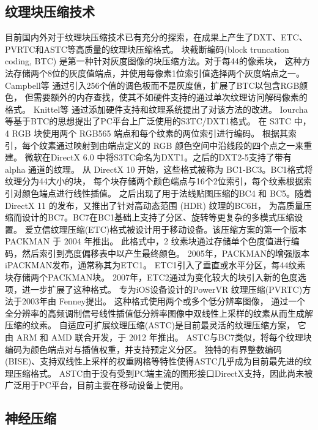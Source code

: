 \subsection{纹理块压缩技术}
目前国内外对于纹理块压缩技术已有充分的探索，在成果上产生了DXT、ETC、PVRTC和ASTC等高质量的纹理块压缩格式。
块截断编码(block truncation coding, BTC)\cite{delp1979image}
是第一种针对灰度图像的块压缩方法。对于每4\times4的像素块，
这种方法存储两个8位的灰度值端点，并使用每像素1位索引值选择两个灰度端点之一。
Campbell等\cite{campbell1986two}
通过引入256个值的调色板而不是灰度值，扩展了BTC以包含RGB颜色，
但需要额外的内存查找，使其不如硬件支持的通过单次纹理访问解码像素的格式。 
Knittel等\cite{knittel1996hardware}
通过添加硬件支持和纹理系统提出了对该方法的改进。
Iourcha等\cite{iourcha1999system}基于BTC的思想提出了PC平台上广泛使用的S3TC/DXT1格式。
在 S3TC 中，4 RGB 块使用两个 RGB565 端点和每个纹素的两位索引进行编码。
根据其索引，每个纹素通过映射到由端点定义的 RGB 颜色空间中沿线段的四个点之一来重建。
微软在DirectX 6.0 中将S3TC命名为DXT1。之后的DXT2-5支持了带有 alpha 通道的纹理。
从 DirectX 10 开始，这些格式被称为 BC1-BC3。BC1格式将纹理分为4\times4大小的块，
每个块存储两个颜色端点与16个2位索引，每个纹素根据索引对颜色端点进行线性插值。
之后出现了用于法线贴图压缩的BC4 和 BC5。随着 DirectX 11 的发布，又推出了针对高动态范围 (HDR) 纹理的BC6H，
为高质量压缩而设计的BC7。BC7在BC1基础上支持了分区、旋转等更复杂的多模式压缩设置。
爱立信纹理压缩(ETC)格式被设计用于移动设备。该压缩方案的第一个版本 PACKMAN\cite{strom2004packman} 于 2004 年推出。
此格式中，2 纹素块通过存储单个色度值进行编码，然后索引到亮度偏移表中以产生最终颜色。
2005年，PACKMAN的增强版本iPACKMAN\cite{strom2005packman}发布，通常称其为ETC1。
ETC1引入了垂直或水平分区，每4\times4纹素块存储两个PACKMAN块。
2007年，ETC2\cite{strom2007etc}通过为变化较大的块引入新的色度选项，进一步扩展了这种格式。
专为iOS设备设计的PowerVR 纹理压缩(PVRTC)方法于2003年由 Fenney\cite{fenney2003texture}提出。
这种格式使用两个或多个低分辨率图像，
通过一个全分辨率的高频调制信号线性插值低分辨率图像中双线性上采样的纹素从而生成解压缩的纹素。
自适应可扩展纹理压缩(ASTC)\cite{nystad2012adaptive}是目前最灵活的纹理压缩方案，
它由 ARM 和 AMD 联合开发，于 2012 年推出。
ASTC与BC7类似，将每个纹理块编码为颜色端点对与插值权重，并支持预定义分区。
独特的有界整数编码(BISE)、支持双线性上采样的权重网格等特性使得ASTC几乎成为目前最先进的纹理压缩格式。
ASTC由于没有受到PC端主流的图形接口DirectX支持，因此尚未被广泛用于PC平台，目前主要在移动设备上使用\cite{vaidyanathan2023random}。


\subsection{神经压缩}

